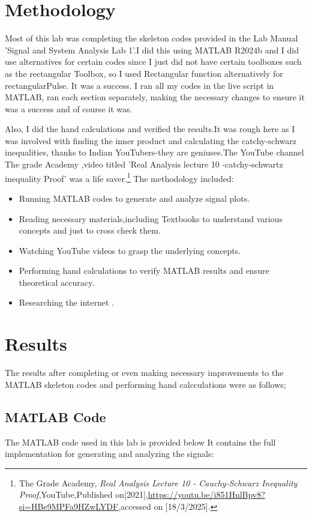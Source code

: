 \documentclass[12pt]{article}
\begin{document}
\section{Methodology}
Most of this lab was completing the skeleton codes provided in the Lab Manual 'Signal and System Analysis Lab 1'.I did this using MATLAB R2024b and I did use alternatives for certain codes since I just did not have certain toolboxes such as the rectangular Toolbox, so I used Rectangular function alternatively for rectangularPulse. It was a success. I ran all my codes in the live script in MATLAB, ran each section separately, making the necessary changes to ensure it was a success and of course it was.

Also, I did the hand calculations and verified the results.It was rough here as I was involved with finding the inner product and calculating the catchy-schwarz inequalities, thanks to Indian YouTubers-they are geniuses.The YouTube channel The grade Academy ,video titled 'Real Analysis lecture 10 -catchy-schwartz inequality Proof' was a life saver.\footnote{The Grade Academy, 
\textit{Real Analysis Lecture 10 - Cauchy-Schwarz Inequality Proof},YouTube,Published on[2021],\url{https://youtu.be/i851HnlBpv8?si=HBe9MPFa9HZwLYDF},accessed on [18/3/2025].} 
The methodology included:
\begin{itemize}
    \item Running MATLAB codes to generate and analyze signal plots.
     \item Reading necessary materials,including Textbooks to understand various concepts and just to cross check them.
    \item Watching YouTube videos to grasp the underlying concepts.
    \item Performing hand calculations to verify MATLAB results and ensure theoretical accuracy.
    \item Researching the internet .
\end{itemize}
\normalsize
\section{Results}
The results after completing or even making necessary improvements to the MATLAB skeleton codes and performing hand calcculations were as follows;
\subsection{MATLAB Code}
The MATLAB code used in this lab is provided below It contains the full implementation for generating and analyzing the signals:

\end{document}
